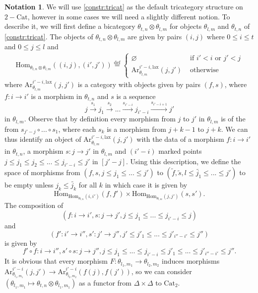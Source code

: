 \documentclass[a4paper, reqno]{amsart}
\theoremstyle{definition}
\newtheorem{notation}[theorem]{Notation}
\newcommand\mor{\mathrm{Hom}}
\newcommand\cat{\mathrm{Cat}}
\newcommand\arr{\mathrm{Ar}}
\newcommand\bydef{\overset{\mathrm{def}}{=}}
\newcommand\lax{\mathrm{lax}}
\begin{document}
\begin{notation}\label{not_arr}
We will use \cref{constr:tricat} as the default tricategory structure on $2-\cat$, however in some cases we will need a slightly different notion. To describe it, we will first define a bicategory $\theta_{t,n}\otimes \theta_{l,m}$ for objects $\theta_{l,m}$ and $\theta_{t,n}$ of \cref{constr:tricat}. The objects of $\theta_{t,n}\otimes \theta_{l,m}$ are given by pairs $(i,j)$ where $0\leq i\leq t$ and $0\leq j\leq l$ and 
\begin{gather*}
    \mor_{\theta_{t,n}\otimes \theta_{l,m}}((i,j),(i',j'))\bydef
    \begin{cases}
        \varnothing &\text{      if $i'<i$ or $j'<j$}\\
        \arr_{\theta_{l,m}}^{i'-i,\lax}(j,j')&\text{       otherwise}
    \end{cases}
\end{gather*}
 where $\arr_{\theta_{l,m}}^{i'-i,\lax}(j,j')$ is a category with objects given by pairs $(f,s)$, where $f:i\rightarrow i'$ is a morphism in $\theta_{t,n}$ and $s$ is a sequence
 \[j\xrightarrow{s_1} j_1\xrightarrow{s_2}...\xrightarrow{s_{i'-i}} j_{i'-i}\xrightarrow{s_{i'-i+1}} j'\]
 in $\theta_{l,m}$. Observe that by definition every morphism from $j$ to $j'$ in $\theta_{l,m}$ is of the from $s_{j'-j}\circ...\circ s_1$, where each $s_k$ is a morphism from $j+k-1$ to $j+k$. We can thus identify an object of $\arr_{\theta_{l,m}}^{i'-i,\lax}(j,j')$ with the data of a morphism $f:i\rightarrow i'$ in $\theta_{t,n}$, a morphism $s:j\rightarrow j'$ in $\theta_{l,m}$ and $(i'-i)$ marked points $j\leq j_1\leq j_2\leq...\leq j_{i'-i}\leq j'$ in $[j'-j]$. Using this description, we define the space of morphisms from $(f,s,j\leq j_1\leq...\leq j')$ to $(\widetilde{f},\widetilde{s},l\leq\widetilde{j_1}\leq...\leq j')$ to be empty unless $j_k\leq\widetilde{j_k}$ for all $k$ in which case it is given by \[\mor_{\mor_{\theta_{t,n}}(i,i')}(f,f')\times\mor_{\mor_{\theta_{l,m}}(j,j')}(s,s').\]
 The composition of 
 \[(f:i\rightarrow i', s:j\rightarrow j',j\leq j_1\leq...\leq j_{i'-i}\leq j)\]
 and 
 \[(f':i'\rightarrow i'', s':j'\rightarrow j'', j'\leq j'_1\leq...\leq j'_{i''-i'}\leq j'')\]
 is given by 
 \[f'\circ f: i\rightarrow i'',s'\circ s:j\rightarrow j'', j\leq j_1\leq...\leq j_{i'-i}\leq j'_1\leq...\leq j'_{i''-i'}\leq j''.\]
 It is obvious that every morphism $F:\theta_{l_1,m_1}\rightarrow\theta_{l_2,m_2}$ induces morphisms $\arr_{\theta_{l_1,m_1}}^{i'-i}(j,j')\rightarrow\arr_{\theta_{l_2,m_2}}^{i'-i}(f(j),f(j'))$, so we can consider $(\theta_{l_1,m_1}\mapsto\theta_{t,n}\otimes\theta_{l_1,m_1})$ as a functor from $\Delta\times\Delta$ to $\cat_2$.
\end{notation}
\end{document}
